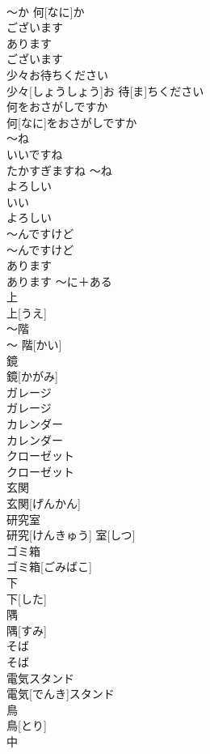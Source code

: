 \documentclass[8pt]{extreport}
\begin{document}
\begin{CJK}{UTF8}{min}
\\	〜か 何[なに]か		
\\	ございます	
\\	あります
\\	ございます		
\\	少々お待ちください	
\\	少々[しょうしょう]お 待[ま]ちください		
\\	何をおさがしですか	
\\	何[なに]をおさがしですか		
\\	〜ね	
\\	いいですね 
\\	たかすぎますね	〜ね		
\\	よろしい	
\\	いい 
\\	よろしい		
\\	〜んですけど	
\\	〜んですけど		
\\	あります	
\\	あります	〜に＋ある	
\\	上	
\\	上[うえ]		
\\	〜階	
\\	〜 階[かい]		
\\	鏡	
\\	鏡[かがみ]		
\\	ガレージ	
\\	ガレージ		
\\	カレンダー	
\\	カレンダー		
\\	クローゼット	
\\	クローゼット		
\\	玄関	
\\	玄関[げんかん]		
\\	研究室	
\\	研究[けんきゅう] 室[しつ]		
\\	ゴミ箱	
\\	ゴミ箱[ごみばこ]		
\\	下	
\\	下[した]		
\\	隅	
\\	隅[すみ]		
\\	そば	
\\	そば		
\\	電気スタンド	
\\	電気[でんき]スタンド		
\\	鳥	
\\	鳥[とり]		
\\	中	

\end{CJK}
\end{document}
